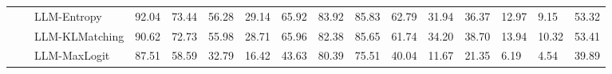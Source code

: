 \begin{table}[ht!]
\begin{tabularx}{\textwidth}{@{}l l l |l *{11}{Y}|Y@{}}
 &  & LLM-Entropy & 92.04 & 73.44 & 56.28 & 29.14 & 65.92 & 83.92 & 85.83 & 62.79 & 31.94 & 36.37 & 12.97 & 9.15 & 53.32 \\
 &  & LLM-KLMatching & 90.62 & 72.73 & 55.98 & 28.71 & 65.96 & 82.38 & 85.65 & 61.74 & 34.20 & 38.70 & 13.94 & 10.32 & 53.41 \\
 &  & LLM-MaxLogit & 87.51 & 58.59 & 32.79 & 16.42 & 43.63 & 80.39 & 75.51 & 40.04 & 11.67 & 21.35 & 6.19 & 4.54 & 39.89 \\
\bottomrule
\end{tabularx}
\label{table::openset_LCR0.1}
\end{table}